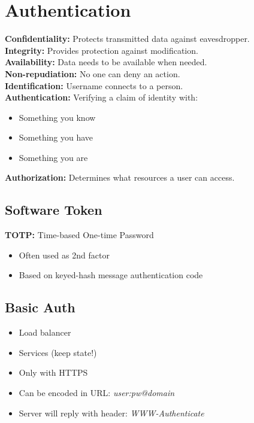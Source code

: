 
\section{Authentication}
\textbf{Confidentiality:} Protects transmitted data against eavesdropper.\\
\textbf{Integrity:} Provides protection against modification.\\
\textbf{Availability:} Data needs to be available when needed.\\
\textbf{Non-repudiation:} No one can deny an action.\\
\textbf{Identification:} Username connects to a person.\\
\textbf{Authentication:} Verifying a claim of identity with:
\begin{itemize}
    \item Something you know
    \item Something you have
    \item Something you are
\end{itemize}
\textbf{Authorization:} Determines what resources a user can access.\\

\subsection{Software Token}
\textbf{TOTP:} Time-based One-time Password
\begin{itemize}
    \item Often used as 2nd factor
    \item Based on keyed-hash message authentication code
\end{itemize}

\subsection{Basic Auth}
\begin{itemize}
    \item Load balancer
    \item Services (keep state!)
    \item Only with HTTPS
    \item Can be encoded in URL: \textit{user:pw@domain}
    \item Server will reply with header: \textit{WWW-Authenticate}
\end{itemize}

